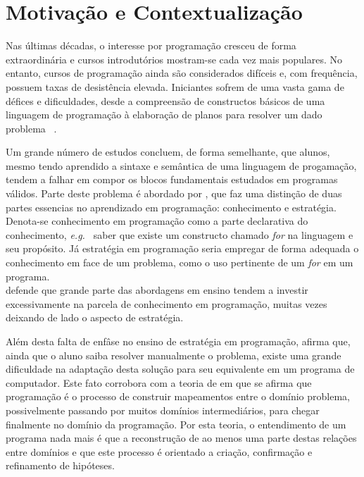 \section{Motivação e Contextualização}
Nas últimas décadas, o interesse por programação cresceu de forma extraordinária 
e cursos introdutórios mostram-se cada vez mais populares. No entanto, 
cursos de programação ainda são considerados difíceis e, com frequência,
possuem taxas de desistência elevada. Iniciantes sofrem de uma 
vasta gama de défices e dificuldades, desde a compreensão de constructos 
básicos de uma linguagem de programação à elaboração de planos
para resolver um dado problema \ \cite{robins2003learning}.

Um grande número de estudos concluem, de forma semelhante, que alunos, 
mesmo tendo aprendido a sintaxe e semântica de uma linguagem 
de progamação, tendem a falhar em compor os blocos fundamentais 
estudados em programas  válidos. Parte deste problema é abordado por 
, que faz uma distinção de duas partes 
essencias no aprendizado em programação: 
conhecimento e estratégia. Denota-se conhecimento em programação como a parte declarativa 
do conhecimento, \emph{e.g.\ } saber que existe um constructo chamado \emph{for} na linguagem 
e seu propósito. Já estratégia em programação seria empregar de forma adequada o conhecimento 
em face de um problema, como o uso pertinente de um \emph{for} em um programa.\\
 defende que grande parte das abordagens em ensino 
tendem a investir excessivamente na parcela de conhecimento em programação, muitas 
vezes deixando de lado o aspecto de estratégia.

Além desta falta de enfâse no ensino de estratégia em programação,
 afirma que, ainda que o aluno saiba resolver 
manualmente o problema,
existe uma grande dificuldade na adaptação 
desta solução para seu equivalente em um programa de computador. Este fato 
corrobora com a teoria de  em que se afirma que programação 
é o processo de construir mapeamentos entre o domínio problema, possivelmente passando 
por muitos domínios intermediários, para chegar finalmente no domínio da programação. 
Por esta teoria, o entendimento de um programa nada mais é que a reconstrução de 
ao menos uma parte destas relações entre domínios e que este processo é orientado 
a criação, confirmação e refinamento de hipóteses.

